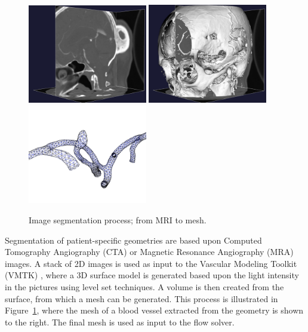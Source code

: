 \begin{figure} \label{fig:kvs-2:imagseg}
  \begin{center}
      \includegraphics[width=5.2cm]{chapters/kvs-2/pdf/stacks.pdf}
      \includegraphics[width=5.2cm]{chapters/kvs-2/pdf/3d.pdf}
      \includegraphics[width=5.2cm]{chapters/kvs-2/pdf/viper3.pdf}
  \end{center}
    \caption{Image segmentation process; from MRI to mesh.}
\end{figure}

Segmentation of patient-specific geometries are based upon Computed
Tomography Angiography (CTA) or Magnetic Resonance Angiography (MRA)
images. A stack of 2D images is used as input to the Vascular Modeling
Toolkit (VMTK) \citep{vmtk}, where a 3D surface model is generated
based upon the light intensity in the pictures using
level set techniques. A volume is then created from the surface, from
which a mesh can be generated. This process is illustrated in
Figure~\ref{fig:kvs-2:imagseg}, where the mesh of a blood vessel
extracted from the geometry is shown to the right. The final mesh is
used as input to the flow solver.

